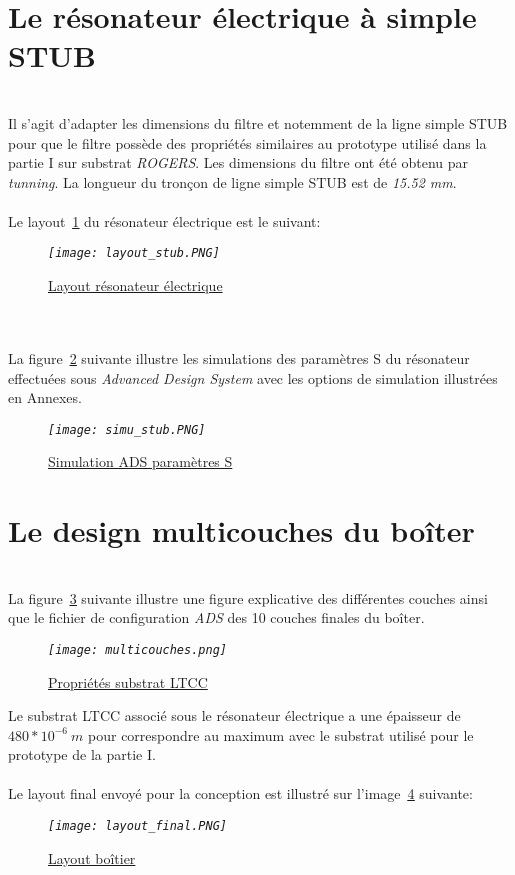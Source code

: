 \documentclass[12pt,fleqn]{book} %
\begin{document}
\section{Le résonateur électrique à simple STUB}
~\\\noindent Il s'agit d'adapter les dimensions du filtre et notemment de la ligne simple STUB pour que le filtre possède des propriétés similaires au prototype utilisé dans la partie I sur substrat \emph{ROGERS}.
Les dimensions du filtre ont été obtenu par \emph{tunning}. La longueur du tronçon de ligne simple STUB est de \emph{15.52 mm}.
~\\\\Le layout~\underline{\color{blue}\ref{layreso}} du résonateur électrique est le suivant:
\begin{figure}[H]
	\centering
	\itshape
	\texttt{[image: layout\_stub.PNG]}
	\caption{\label{layreso} \underline{Layout résonateur électrique}}
\end{figure}
~\\\\La figure~\underline{\color{blue}\ref{simu_stub}} suivante illustre les simulations des paramètres S du résonateur effectuées sous \emph{Advanced Design System} avec les options de simulation illustrées en Annexes.
\begin{figure}[H]
	\centering
	\itshape
	\texttt{[image: simu\_stub.PNG]}
	\caption{\label{simu_stub} \underline{Simulation ADS paramètres S}}
\end{figure}
\section{Le design multicouches du boîter}
~\\La figure~\underline{\color{blue}\ref{multicouches}} suivante illustre une figure explicative des différentes couches ainsi que le fichier de configuration \emph{ADS} des 10 couches finales du boîter.
\begin{figure}[H]
	\centering
	\itshape
	\texttt{[image: multicouches.png]}
	\caption{\label{multicouches} \underline{Propriétés substrat LTCC}}
\end{figure}
\noindent Le substrat LTCC associé sous le résonateur électrique a une épaisseur de $480*10^{-6}\ m$ pour correspondre au maximum avec le substrat utilisé pour le prototype de la partie I.
~\\\\Le layout final envoyé pour la conception est illustré sur l'image~\underline{\color{blue}\ref{layoutfinal}} suivante:
\begin{figure}[H]
	\centering
	\itshape
	\texttt{[image: layout\_final.PNG]}
	\caption{\label{layoutfinal} \underline{Layout boîtier}}
\end{figure}
\end{document}
